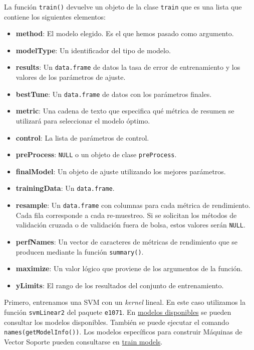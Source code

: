\documentclass[12pt,spanish,a4paper]{article}
\numberwithin{equation}{section}
\begin{document}
La función \texttt{train()} devuelve un objeto de la clase
\texttt{train} que es una lista que contiene los siguientes elementos:

\begin{itemize}
\item
  \textbf{method}: El modelo elegido. Es el que hemos pasado como
  argumento.
\item
  \textbf{modelType}: Un identificador del tipo de modelo.
\item
  \textbf{results}: Un \texttt{data.frame} de datos la tasa de error de
  entrenamiento y los valores de los parámetros de ajuste.
\item
  \textbf{bestTune}: Un \texttt{data.frame} de datos con los parámetros
  finales.
\item
  \textbf{metric}: Una cadena de texto que especifica qué métrica de
  resumen se utilizará para seleccionar el modelo óptimo.
\item
  \textbf{control}: La lista de parámetros de control.
\item
  \textbf{preProcess}: \texttt{NULL} o un objeto de clase
  \texttt{preProcess}.
\item
  \textbf{finalModel}: Un objeto de ajuste utilizando los mejores
  parámetros.
\item
  \textbf{trainingData}: Un \texttt{data.frame}.
\item
  \textbf{resample}: Un \texttt{data.frame} con columnas para cada
  métrica de rendimiento. Cada fila corresponde a cada re-muestreo. Si
  se solicitan los métodos de validación cruzada o de validación fuera
  de bolsa, estos valores serán \texttt{NULL}.
\item
  \textbf{perfNames}: Un vector de caracteres de métricas de rendimiento
  que se producen mediante la función \texttt{summary()}.
\item
  \textbf{maximize}: Un valor lógico que proviene de los argumentos de
  la función.
\item
  \textbf{yLimits}: El rango de los resultados del conjunto de
  entrenamiento.
\end{itemize}

Primero, entrenamos una SVM con un \emph{kernel} lineal. En este caso
utilizamos la función \texttt{svmLinear2} del paquete \texttt{e1071}. En
\href{http://topepo.github.io/caret/available-models.html}{modelos
disponibles} se pueden consultar los modelos disponibles. También se
puede ejecutar el comando \texttt{names(getModelInfo())}. Los modelos
específicos para construir Máquinas de Vector Soporte pueden consultarse
en
\href{http://topepo.github.io/caret/train-models-by-tag.html\#support-vector-machines}{train
models}.
\end{document}
